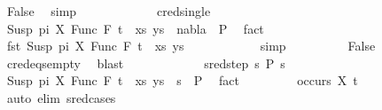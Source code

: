 \begin{isabellebody}
\ False\ \isamarkupfalse%
\ simp\isanewline
\ \ \ \ \isamarkupfalse%
\isanewline
\ \ \ \ \ \ \isamarkupfalse%
\ cred{\isacharunderscore}{\kern0pt}single\isanewline
\ \ \ \ \ \ \isamarkupfalse%
\ {\isachardoublequoteopen}{\isacharparenleft}{\kern0pt}{\isacharparenleft}{\kern0pt}Susp\ pi\ X{\isacharcomma}{\kern0pt}\ Func\ F\ t{\isacharparenright}{\kern0pt}\ {\isacharhash}{\kern0pt}\ xs{\isacharcomma}{\kern0pt}\ ys{\isacharparenright}{\kern0pt}\ {\isasymturnstile}\ nabla\ {\isasymrightarrow}\ P{}{\isachardoublequoteclose}\ \isamarkupfalse%
\ fact\isanewline
\ \ \ \ \ \ \isamarkupfalse%
\ \isamarkupfalse%
\ {\isachardoublequoteopen}fst\ {\isacharparenleft}{\kern0pt}{\isacharparenleft}{\kern0pt}Susp\ pi\ X{\isacharcomma}{\kern0pt}\ Func\ F\ t{\isacharparenright}{\kern0pt}\ {\isacharhash}{\kern0pt}\ xs{\isacharcomma}{\kern0pt}\ ys{\isacharparenright}{\kern0pt}\ {\isasymnoteq}\ {\isacharbrackleft}{\kern0pt}{\isacharbrackright}{\kern0pt}{\isachardoublequoteclose}\isanewline
\ \ \ \ \ \ \ \ \isamarkupfalse%
\ simp\isanewline
\ \ \ \ \ \ \isamarkupfalse%
\ \isamarkupfalse%
\ False\ \isanewline
\ \ \ \ \ \ \ \ \isamarkupfalse%
\ c{\isacharunderscore}{\kern0pt}red{\isacharunderscore}{\kern0pt}eqs{\isacharunderscore}{\kern0pt}empty\ \isamarkupfalse%
\ blast\isanewline
\ \ \ \ \isamarkupfalse%
\isanewline
\ \ \ \ \ \ \isamarkupfalse%
\ {\isacharparenleft}{\kern0pt}sred{\isacharunderscore}{\kern0pt}step\ s{}\ P{}\ s{}{\isacharparenright}{\kern0pt}\isanewline
\ \ \ \ \ \ \isamarkupfalse%
\ {\isachardoublequoteopen}{\isacharparenleft}{\kern0pt}{\isacharparenleft}{\kern0pt}Susp\ pi\ X{\isacharcomma}{\kern0pt}\ Func\ F\ t{\isacharparenright}{\kern0pt}\ {\isacharhash}{\kern0pt}\ xs{\isacharcomma}{\kern0pt}\ ys{\isacharparenright}{\kern0pt}\ {\isasymturnstile}\ s{}\ {\isasymleadsto}\ P{}{\isachardoublequoteclose}\ \isamarkupfalse%
\ fact\isanewline
\ \ \ \ \ \ \isamarkupfalse%
\ {\isachardoublequoteopen}{\isasymnot}\ occurs\ X\ t{\isachardoublequoteclose}\ \isanewline
\ \ \ \ \ \ \ \ \ \isamarkupfalse%
\ {\isacharparenleft}{\kern0pt}auto\ elim{\isacharcolon}{\kern0pt}\ s{\isacharunderscore}{\kern0pt}red{\isachardot}{\kern0pt}cases{\isacharparenright}{\kern0pt}\isanewline

\end{isabellebody}
